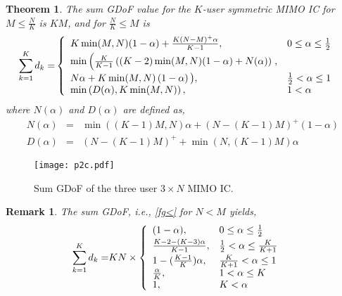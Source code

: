 \documentclass[11pt]{article}
\newtheorem{theorem}{Theorem}
\newtheorem{remark}{Remark}
\begin{document}
\begin{theorem}\label{theorem:GDoF1} The sum GDoF value for the $K$-user  symmetric MIMO IC for $M\le \frac{N}{K}$ is $KM$, and for $\frac{N}{K}\le M$ is
\begin{align}
{\sum_{k=1}^Kd_k}=&\left\{
\begin{array}{ll} 
K\min(M,N)(1-\alpha)+\frac{K(N-M)^+\alpha}{K-1},&0\leq\alpha\leq \frac{1}{2}\vspace{0.03in}\\ 
\min\left(\frac{K}{K-1}\left((K-2)\min(M,N)(1-\alpha)+N(\alpha)\right)\right., &\vspace{0.03in}\\ 
N\alpha+K\min(M,N)\left(1-\alpha\right)\big),&\frac{1}{2}<\alpha\leq 1\\
\min\left(D(\alpha),K\min(M,N)\right), &1<\alpha
\end{array}
\right.\label {fg<}
\end{align}
where $N(\alpha)$ and $D(\alpha)$ are defined as,
\begin{eqnarray}
N(\alpha)&=&\min((K-1)M,N)\alpha+(N-(K-1)M)^+(1-\alpha)\\
D(\alpha)&=&(N-(K-1)M)^++\min(N,(K-1)M)\alpha 
\end{eqnarray}
\end{theorem}
\begin{figure}[tp]
\centering 
\texttt{[image: p2c.pdf]}
\caption{Sum GDoF of the three user $3 \times N$ MIMO IC.}
\label{Fig1}
\end{figure}
\begin{remark} The sum GDoF, i.e., \eqref{fg<} for $N< M$ yields,
\begin{align}
{\sum_{k=1}^Kd_k}=&{KN}\times  \left\{
\begin{array}{ll} 
(1-\alpha),&0\leq\alpha\leq \frac{1}{2}\vspace{0.03in}\\ 
\frac{K-2-(K-3)\alpha}{K-1}, &\frac{1}{2}<\alpha\leq\frac{K}{K+1}\vspace{0.03in}\\ 
1-(\frac{K-1}{K})\alpha,&\frac{K}{K+1}<\alpha\leq 1\\
\frac{\alpha}{K},& 1<\alpha\leq K\\
1, &K<\alpha
\end{array}
\right.\label {GDOFM>N}
\end{align}
\end{remark}
\end{document}
